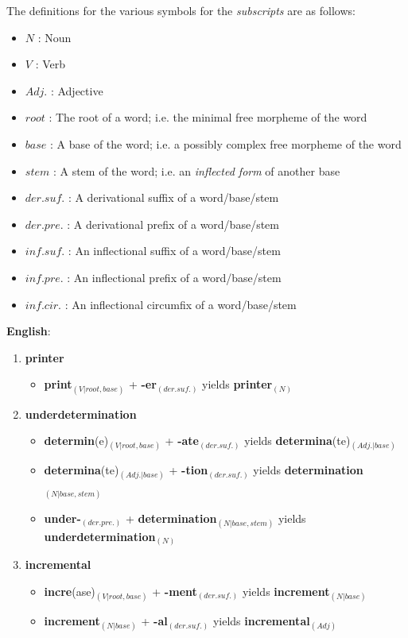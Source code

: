 \documentclass[11pt]{article}
\begin{document}
\newpage

\begin{solution}
The definitions for the various symbols for the \textit{subscripts} are as follows:
\begin{itemize}
	\item $N$ : Noun
	\item $V$ : Verb
	\item $Adj.$ : Adjective
	\item $root$ : The root of a word; i.e. the minimal free morpheme of the word
	\item $base$ : A base of the word; i.e. a possibly complex free morpheme of the word
	\item $stem$ : A stem of the word; i.e. an \textit{inflected form} of another base
	\item $der. suf.$ : A derivational suffix of a word/base/stem
	\item $der. pre.$ : A derivational prefix of a word/base/stem
	\item $inf. suf.$ : An inflectional suffix of a word/base/stem
	\item $inf. pre.$ : An inflectional prefix of a word/base/stem
	\item $inf. cir.$ : An inflectional circumfix of a word/base/stem
\end{itemize}

\textbf{English}:
\begin{enumerate}
	\item \textbf{printer}
		\begin{itemize}
			\item \textbf{print}$_{(V|root, base)}$ + \textbf{-er}$_{(der. suf.)}$ yields \textbf{printer}$_{(N)}$
		\end{itemize}
	\item \textbf{underdetermination}
		\begin{itemize}
			\item \textbf{determin}(e)$_{(V|root, base)}$ + \textbf{-ate}$_{(der. suf.)}$ yields \textbf{determina}(te)$_{(Adj.|base)}$
			\item \textbf{determina}(te)$_{(Adj.| base)}$ + \textbf{-tion}$_{(der. suf.)}$ yields \textbf{determination}$_{(N|base,stem)}$
			\item \textbf{under-}$_{(der. pre.)}$ + \textbf{determination}$_{(N| base,stem)}$  yields \textbf{underdetermination}$_{(N)}$
		\end{itemize}
	\item \textbf{incremental}
		\begin{itemize}
			\item \textbf{incre}(ase)$_{(V|root, base)}$ + \textbf{-ment}$_{(der. suf.)}$ yields \textbf{increment}$_{(N|base)}$
			\item \textbf{increment}$_{(N|base)}$ + \textbf{-al}$_{(der. suf.)}$ yields \textbf{incremental}$_{(Adj)}$
		\end{itemize}
\end{enumerate}


\end{solution}
\end{document}

